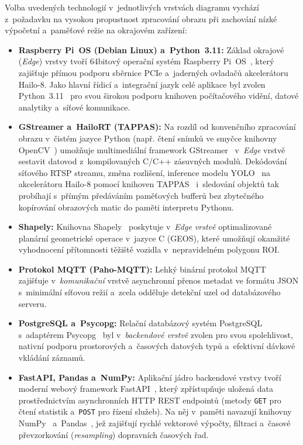 Volba uvedených technologií v~jednotlivých vrstvách diagramu vychází z~požadavku na vysokou propustnost zpracování obrazu při zachování nízké výpočetní a~paměťové režie na okrajovém zařízení:
\begin{itemize}
    \item \textbf{Raspberry Pi~OS (Debian Linux) a~Python~3.11:} Základ okrajové (\textit{Edge}) vrstvy tvoří 64bitový operační systém Raspberry Pi~OS~\cite{raspberrypi_docs_2024}, který zajišťuje přímou podporu sběrnice \acs{PCIe} a~jaderných ovladačů akcelerátoru Hailo-8. Jako hlavní řídicí a~integrační jazyk celé aplikace byl zvolen Python~3.11~\cite{python_docs_313_2025} pro svou širokou podporu knihoven počítačového vidění, datové analytiky a~síťové komunikace.
    \item \textbf{GStreamer a~HailoRT (TAPPAS):} Na rozdíl od konvenčního zpracování obrazu v~čistém jazyce Python (např. čtení snímků ve smyčce knihovny OpenCV~\cite{bradski_opencv_2000}) umožňuje multimediální framework GStreamer~\cite{gstreamer_docs} v~\textit{Edge} vrstvě sestavit datovod z~kompilovaných C/C++ zásuvných modulů. Dekódování síťového \acs{RTSP} streamu, změna rozlišení, inference modelu \acs{YOLO}~\cite{ultralytics_yolov8_docs} na akcelerátoru Hailo-8 pomocí knihoven TAPPAS~\cite{tappas_user_guide_331} i~sledování objektů tak probíhají s~přímým předáváním paměťových bufferů bez zbytečného kopírování obrazových matic do paměti interpretu Pythonu.
    \item \textbf{Shapely:} Knihovna Shapely~\cite{shapely_docs} poskytuje v~\textit{Edge vrstvě} optimalizované planární geometrické operace v~jazyce C (GEOS), které umožňují okamžité vyhodnocení přítomnosti těžiště vozidla v~nepravidelném polygonu ROI.
    \item \textbf{Protokol MQTT (Paho-MQTT):} Lehký binární protokol MQTT~\cite{mqtt_oasis_2019} zajišťuje v~\textit{komunikační} vrstvě asynchronní přenos metadat ve formátu \acs{JSON} s~minimální síťovou režií a~zcela odděluje detekční uzel od databázového serveru.
    \item \textbf{PostgreSQL a~Psycopg:} Relační databázový systém PostgreSQL s~adaptérem Psycopg~\cite{psycopg_docs_2025} byl v~\textit{backendové vrstvě} zvolen pro svou spolehlivost, nativní podporu prostorových a~časových datových typů a~efektivní dávkové vkládání záznamů.
    \item \textbf{FastAPI, Pandas a~NumPy:} Aplikační jádro backendové vrstvy tvoří moderní webový framework FastAPI~\cite{fastapi_docs}, který zpřístupňuje uložená data prostřednictvím asynchronních \acs{HTTP} \acs{REST} endpointů (metody \texttt{GET} pro čtení statistik a~\texttt{POST} pro řízení služeb). Na něj v~paměti navazují knihovny NumPy~\cite{harris_numpy_2020} a~Pandas~\cite{mckinney_pandas_2010}, jež zajišťují rychlé vektorové výpočty, filtraci a~časové převzorkování (\textit{resampling}) dopravních časových řad.

\end{itemize}
